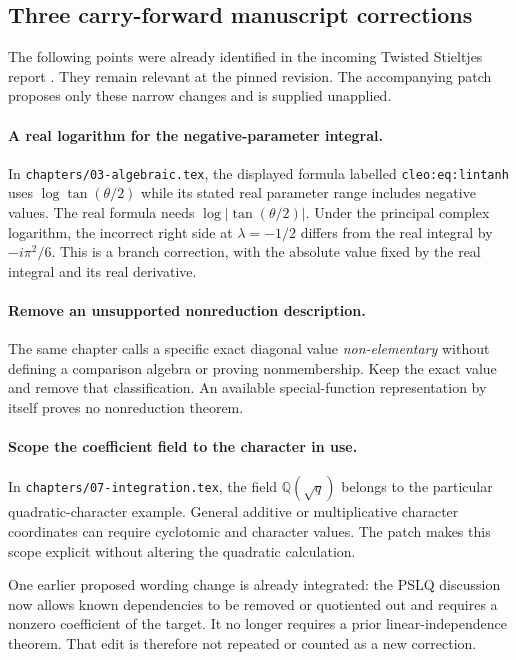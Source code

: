 \documentclass[11pt,a4paper]{article}
\theoremstyle{definition}
\theoremstyle{remark}
\numberwithin{equation}{section}
\begin{document}
\subsection{Three carry-forward manuscript corrections}

The following points were already identified in the incoming
Twisted Stieltjes report \cite{IncomingTwisted}. They remain relevant
at the pinned revision. The accompanying patch proposes only these
narrow changes and is supplied unapplied.

\paragraph{A real logarithm for the negative-parameter integral.}
In \texttt{chapters/03-algebraic.tex}, the displayed formula labelled
\texttt{cleo:eq:lintanh} uses $\log\tan(\theta/2)$ while its stated
real parameter range includes negative values. The real formula needs
$\log|\tan(\theta/2)|$. Under the principal complex logarithm,
the incorrect right side at $\lambda=-1/2$ differs from the real
integral by $-i\pi^2/6$. This is a branch correction, with the
absolute value fixed by the real integral and its real derivative.

\paragraph{Remove an unsupported nonreduction description.}
The same chapter calls a specific exact diagonal value
\emph{non-elementary} without defining a comparison algebra or proving
nonmembership. Keep the exact value and remove that classification.
An available special-function representation by itself proves no
nonreduction theorem.

\paragraph{Scope the coefficient field to the character in use.}
In \texttt{chapters/07-integration.tex}, the field
$\mathbb Q(\sqrt q)$ belongs to the particular quadratic-character
example. General additive or multiplicative character coordinates
can require cyclotomic and character values. The patch makes this
scope explicit without altering the quadratic calculation.

One earlier proposed wording change is already integrated: the PSLQ
discussion now allows known dependencies to be removed or quotiented
out and requires a nonzero coefficient of the target. It no longer
requires a prior linear-independence theorem. That edit is therefore
not repeated or counted as a new correction.
\end{document}

